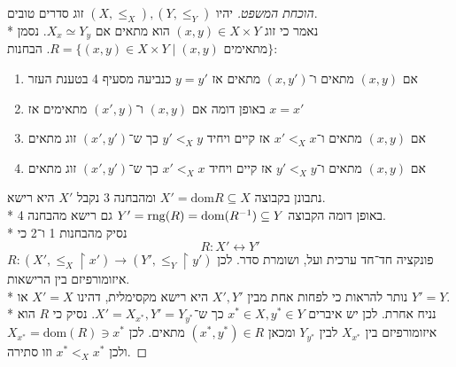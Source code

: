 \begin{proof}[הוכחת המשפט]
	יהיו $(X, \le_X), (Y, \le_Y)$ זוג סדרים טובים. \\*
	נאמר כי זוג $(x, y) \in X \times Y$ הוא מתאים אם $X_x \simeq Y_y$.
	נסמן $R = \{ (x, y) \in X \times Y \mid (x, y) \text{ מתאימים} \}$.
	הבחנות:
	\begin{enumerate}
		\item אם $(x, y)$ מתאים ו־$(x, y')$ מתאים אז $y = y'$ כנביעה מסעיף 4 בטענת העזר
		\item באופן דומה אם $(x, y)$ ו־$(x', y)$ מתאימים אז $x = x'$
		\item אם $(x, y)$ מתאים ו־$x' <_X x$ אז קיים ויחיד $y' <_X y$ כך ש־$(x', y')$ זוג מתאים
		\item אם $(x, y)$ מתאים ו־$y' <_X y$ אז קיים ויחיד $x' <_X x$ כך ש־$(x', y')$ זוג מתאים
	\end{enumerate}
	נתבונן בקבוצה $X' = \text{dom} R \subseteq X$ ומהבחנה 3 נקבל $X'$ היא רישא. \\*
	באופן דומה הקבוצה $Y' = \operatorname{rng}(R) = \text{dom}(R^{-1}) \subseteq Y$ גם רישא מהבחנה 4. \\*
	נסיק מהבחנות 1 ו־2 כי
	\[
		R : X' \leftrightarrow Y'
	\]
	פונקציה חד־חד ערכית ועל, ושומרת סדר.
	לכן $R : (X', \le_X \upharpoonright x') \to (Y', \le_Y \upharpoonright y')$ איזומורפיזם בין הרישאות. \\*
	נותר להראות כי לפחות אחת מבין $X', Y'$ היא רישא מקסימלית, דהינו $X' = X$ או $Y' = Y$. \\*
	נניח אחרת. לכן יש איברים $x^* \in X, y^* \in Y$ כך ש־$X' = X_{x^*}, Y' = Y_{y^*}$.
	נסיק כי $R$ הוא איזומורפיזם בין $X_{x^*}$ לבין $Y_{y^*}$ ומכאן $(x^*, y^*) \in R$ מתאים.
	לכן $X_{x^*} = \text{dom}(R) \ni x^*$ ולכן $x^* <_X x^*$ וזו סתירה.
\end{proof}

